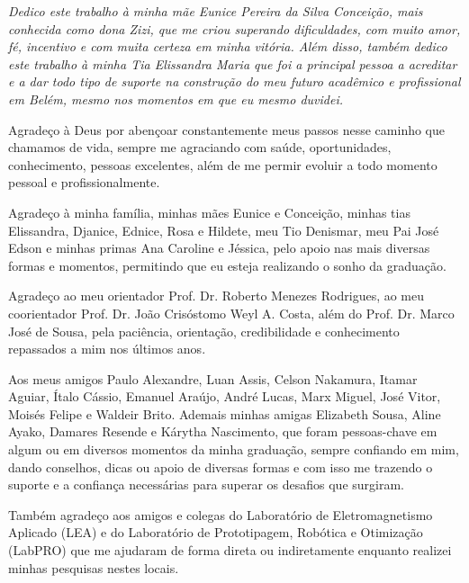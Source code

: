 \documentclass[
	12pt,				%
	openright,			%
	oneside,			%
	a4paper,			%
	english,			%
	brazil				%
	]{abntex2}
\begin{document}
\begin{dedicatoria}
   \vspace*{\fill}
   \centering
   \noindent
   \textit{ Dedico este trabalho à minha mãe Eunice Pereira da Silva Conceição, mais conhecida como dona Zizi, que me criou superando dificuldades, com muito amor, fé, incentivo e com muita certeza em minha vitória. Além disso, também dedico este trabalho à minha Tia Elissandra Maria que foi a principal pessoa a acreditar e a dar todo tipo de suporte na construção do meu futuro acadêmico e profissional em Belém, mesmo nos momentos em que eu mesmo duvidei. } \vspace*{\fill}
\end{dedicatoria}

\begin{agradecimentos}
Agradeço à Deus por abençoar constantemente meus passos nesse caminho que chamamos de vida, sempre me agraciando com saúde, oportunidades, conhecimento, pessoas excelentes, além de me permir evoluir a todo momento pessoal e profissionalmente.

Agradeço à minha família, minhas mães Eunice e Conceição, minhas tias Elissandra, Djanice, Ednice, Rosa e Hildete, meu Tio Denismar, meu Pai José Edson e minhas primas Ana Caroline e Jéssica, pelo apoio nas mais diversas formas e momentos, permitindo que eu esteja realizando o sonho da graduação. 

Agradeço ao meu orientador Prof. Dr. Roberto Menezes Rodrigues, ao meu coorientador Prof. Dr. João Crisóstomo Weyl A. Costa, além do Prof. Dr. Marco José de Sousa, pela paciência, orientação, credibilidade e conhecimento repassados a mim nos últimos anos.

Aos meus amigos Paulo Alexandre, Luan Assis, Celson Nakamura, Itamar Aguiar, Ítalo Cássio, Emanuel Araújo, André Lucas, Marx Miguel, José Vitor, Moisés Felipe e Waldeir Brito. Ademais minhas amigas Elizabeth Sousa, Aline Ayako, Damares Resende e Kárytha Nascimento, que foram pessoas-chave em algum ou em diversos momentos da minha graduação, sempre confiando em mim, dando conselhos, dicas ou apoio de diversas formas e com isso me trazendo o suporte e a confiança necessárias para superar os desafios que surgiram.

	Também agradeço aos amigos e colegas do Laboratório de Eletromagnetismo Aplicado (LEA) e do Laboratório de Prototipagem, Robótica e Otimização (LabPRO) que me ajudaram de forma direta ou indiretamente enquanto realizei minhas pesquisas nestes locais.


\end{agradecimentos}
\end{document}
